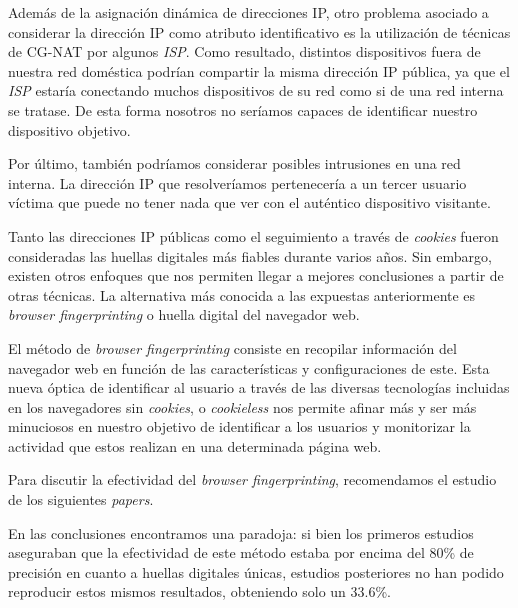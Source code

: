 Además de la asignación dinámica de direcciones IP, otro problema asociado a considerar la dirección IP como atributo identificativo es la utilización de técnicas de CG-NAT por algunos \textit{ISP}. Como resultado, distintos dispositivos fuera de nuestra red doméstica podrían compartir la misma dirección IP pública, ya que el \textit{ISP} estaría conectando muchos dispositivos de su red como si de una red interna se tratase. De esta forma nosotros no seríamos capaces de identificar nuestro dispositivo objetivo. \par

Por último, también podríamos considerar posibles intrusiones en una red interna. La dirección IP que resolveríamos pertenecería a un tercer usuario víctima que puede no tener nada que ver con el auténtico dispositivo visitante.  \par

Tanto las direcciones IP públicas como el seguimiento a través de \textit{cookies} fueron consideradas las huellas digitales más fiables durante varios años. Sin embargo, existen otros enfoques que nos permiten llegar a mejores conclusiones a partir de otras técnicas. La alternativa más conocida a las expuestas anteriormente es \textit{browser fingerprinting} o huella digital del navegador web. \par

El método de \textit{browser fingerprinting}\cite{fingerprint} consiste en recopilar información del navegador web en función de las características y configuraciones de este. Esta nueva óptica de identificar al usuario a través de las diversas tecnologías incluidas en los navegadores sin \textit{cookies}, o \textit{cookieless}\cite{cookieless} nos permite afinar más y ser más minuciosos en nuestro objetivo de identificar a los usuarios y monitorizar la actividad que estos realizan en una determinada página web. \par 

Para discutir la efectividad del \textit{browser fingerprinting}, recomendamos el estudio de los siguientes \textit{papers}\cite{panop_paper, javascript_paper, effective_paper}. \par 

En las conclusiones encontramos una paradoja: si bien los primeros estudios aseguraban que la efectividad de este método estaba por encima del 80\% de precisión en cuanto a huellas digitales únicas\cite{panop_paper, javascript_paper}, estudios posteriores no han podido reproducir estos mismos resultados, obteniendo solo un 33.6\%\cite{effective_paper}. \par

